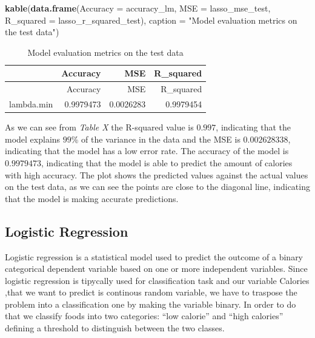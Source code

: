 \documentclass[
]{article}
\newenvironment{Shaded}{\begin{snugshade}}{\end{snugshade}}
\newcommand{\AttributeTok}[1]{\textcolor[rgb]{0.13,0.29,0.53}{#1}}
\newcommand{\FunctionTok}[1]{\textcolor[rgb]{0.13,0.29,0.53}{\textbf{#1}}}
\newcommand{\NormalTok}[1]{#1}
\newcommand{\StringTok}[1]{\textcolor[rgb]{0.31,0.60,0.02}{#1}}
\begin{document}
\begin{Shaded}
\begin{Highlighting}[]
\FunctionTok{kable}\NormalTok{(}\FunctionTok{data.frame}\NormalTok{(}\AttributeTok{Accuracy =}\NormalTok{ accuracy\_lm, }\AttributeTok{MSE =}\NormalTok{ lasso\_mse\_test, }
                 \AttributeTok{R\_squared =}\NormalTok{ lasso\_r\_squared\_test),}
      \AttributeTok{caption =} \StringTok{"Model evaluation metrics on the test data"}\NormalTok{)}
\end{Highlighting}
\end{Shaded}

\begin{longtable}[]{@{}lrrr@{}}
\caption{Model evaluation metrics on the test data}\tabularnewline
\toprule\noalign{}
& Accuracy & MSE & R\_squared \\
\midrule\noalign{}
\endfirsthead
\toprule\noalign{}
& Accuracy & MSE & R\_squared \\
\midrule\noalign{}
\endhead
\bottomrule\noalign{}
\endlastfoot
lambda.min & 0.9979473 & 0.0026283 & 0.9979454 \\
\end{longtable}

As we can see from \emph{Table X} the R-squared value is \(0.997\),
indicating that the model explains \(99\)\% of the variance in the data
and the MSE is \(0.002628338\), indicating that the model has a low
error rate. The accuracy of the model is \(0.9979473\), indicating that
the model is able to predict the amount of calories with high accuracy.
The plot shows the predicted values against the actual values on the
test data, as we can see the points are close to the diagonal line,
indicating that the model is making accurate predictions.

\subsection{Logistic Regression}\label{logistic-regression}

Logistic regression is a statistical model used to predict the outcome
of a binary categorical dependent variable based on one or more
independent variables. Since logistic regression is tipycally used for
classification task and our variable Calories ,that we want to predict
is continous random variable, we have to traspose the problem into a
classification one by making the variable binary. In order to do that we
classify foods into two categories: ``low calorie'' and ``high
calories'' defining a threshold to distinguish between the two classes.
\end{document}
